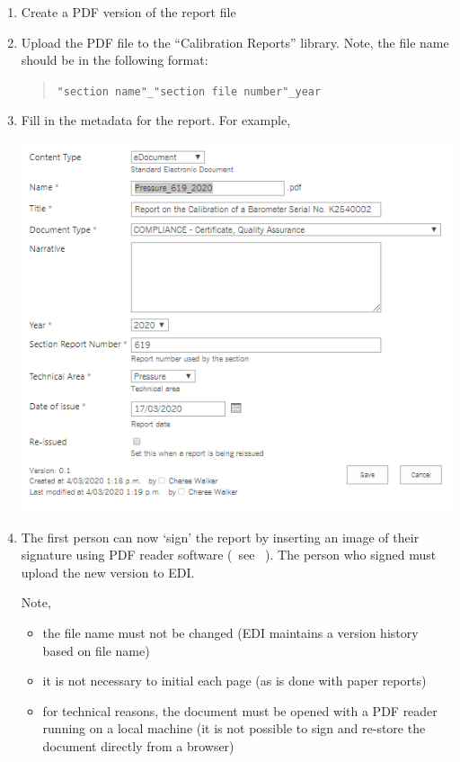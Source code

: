\begin{enumerate}
\item Create a PDF version of the report file
\item Upload the PDF file to the ``Calibration Reports'' library. Note, the file name should be in the following format:
\begin{quote}
\texttt{"section name"\_"section file number"\_year}
\end{quote}
\item Fill in the metadata for the report. For example,
\begin{center}
\includegraphics[scale=.9]{pictures/metadata_signed_report}
\end{center}
\item The first person can now `sign' the report by inserting an image of their signature using PDF reader software (~see \cite[\S\ref*{GRP-ss:electronic_reports}]{MSL_Reporting_Guidelines}~). The person who signed must upload the new version to EDI.

Note,
\begin{itemize}
\item the file name must not be changed (EDI maintains a version history based on file name)
\item it is not necessary to initial each page (as is done with paper reports)
\item for technical reasons, the document must be opened with a PDF reader running on a local machine (it is not possible to sign and re-store the document directly from a browser)
\end{itemize}


\end{enumerate}
